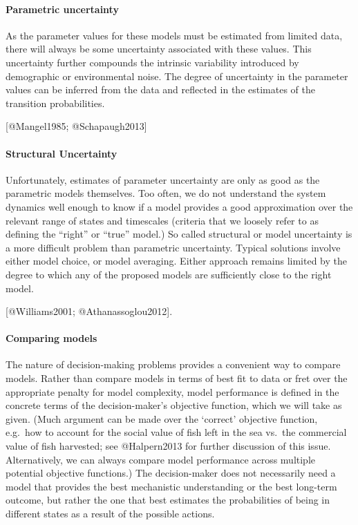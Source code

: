 \documentclass[author-year, review]{elsarticle} %
\begin{document}
\paragraph{Parametric uncertainty}

As the parameter values for these models must be estimated from limited
data,\\there will always be some uncertainty associated with these
values. This uncertainty further compounds the intrinsic variability
introduced by demographic or environmental noise. The degree of
uncertainty in the parameter values can be inferred from the data and
reflected in the estimates of the transition probabilities.

{[}@Mangel1985; @Schapaugh2013{]}

\paragraph{Structural Uncertainty}

Unfortunately, estimates of parameter uncertainty are only as good as
the parametric models themselves. Too often, we do not understand the
system dynamics well enough to know if a model provides a good
approximation over the relevant range of states and timescales (criteria
that we loosely refer to as defining the ``right'' or ``true'' model.)
So called structural or model uncertainty is a more difficult problem
than parametric uncertainty. Typical solutions involve either model
choice, or model averaging. Either approach remains limited by the
degree to which any of the proposed models are sufficiently close to the
right model.

{[}@Williams2001; @Athanassoglou2012{]}.

\paragraph{Comparing models}

The nature of decision-making problems provides a convenient way to
compare models. Rather than compare models in terms of best fit to data
or fret over the appropriate penalty for model complexity, model
performance is defined in the concrete terms of the decision-maker's
objective function, which we will take as given. (Much argument can be
made over the `correct' objective function, e.g.~how to account for the
social value of fish left in the sea vs.~the commercial value of fish
harvested; see @Halpern2013 for further discussion of this issue.
Alternatively, we can always compare model performance across multiple
potential objective functions.) The decision-maker does not necessarily
need a model that provides the best mechanistic understanding or the
best long-term outcome, but rather the one that best estimates the
probabilities of being in different states as a result of the possible
actions.
\end{document}
